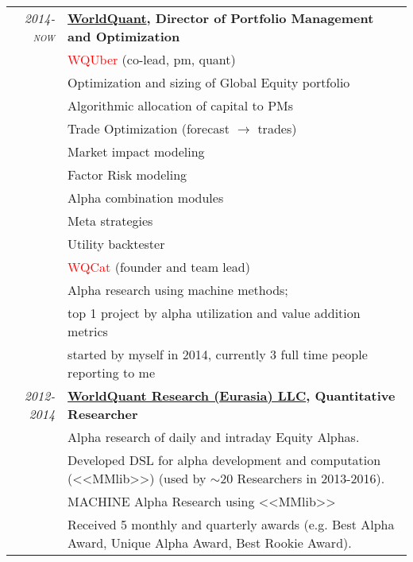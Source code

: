 \documentclass[unicode,a4paper,10pt]{article}
\begin{document}
\begin{tabular}{r p{13cm}}
 \emph{\textsc{2014-now}} & \textbf{\href{https://www.worldquant.com/}{WorldQuant}, Director of Portfolio Management and Optimization} \\
&\footnotesize{\textcolor{red}{WQUber}} (co-lead, pm, quant) \\
&\footnotesize{\hspace{0.5cm} Optimization and sizing of Global Equity portfolio}\\
&\footnotesize{\hspace{0.5cm} Algorithmic allocation of capital to PMs}\\
&\footnotesize{\hspace{0.5cm} Trade Optimization (forecast $\to$ trades)}\\
&\footnotesize{\hspace{0.5cm} Market impact modeling}\\
&\footnotesize{\hspace{0.5cm} Factor Risk modeling}\\
&\footnotesize{\hspace{0.5cm} Alpha combination modules}\\
&\footnotesize{\hspace{0.5cm} Meta strategies}\\
&\footnotesize{\hspace{0.5cm} Utility backtester}\\
&\footnotesize{\textcolor{red}{WQCat}} (founder and team lead)\\
&\footnotesize{\hspace{0.5cm} Alpha research using machine methods;} \\
&\footnotesize{\hspace{0.5cm} top 1 project by alpha utilization and value addition metrics}\\
&\footnotesize{\hspace{0.5cm} started by myself in 2014, currently 3 full time people reporting to me}\\
\emph{\textsc{2012-2014}} & \textbf{\href{https://www.worldquant.com/}{WorldQuant Research (Eurasia) LLC}, Quantitative Researcher} \\
&\footnotesize{Alpha research of daily and intraday Equity Alphas.}\\
&\footnotesize{Developed DSL for alpha development and computation (<<MMlib>>) (used by $\sim$20 Researchers in 2013-2016).}\\
&\footnotesize{MACHINE Alpha Research using <<MMlib>>}\\
&\footnotesize{Received 5 monthly and quarterly awards (e.g. Best Alpha Award, Unique Alpha Award, Best Rookie Award).}\\



\end{tabular}
\end{document}
